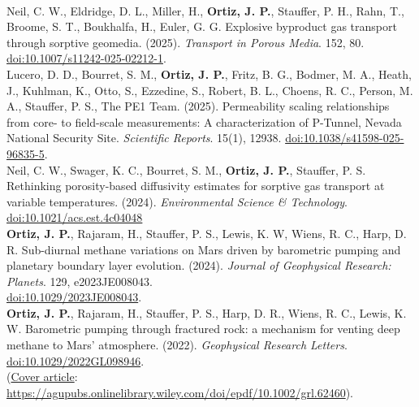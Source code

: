 \documentclass[11pt, letterpaper]{article}
\newcommand{\years}[1]{\marginnote{\scriptsize #1}}
\begin{document}
\JournalofEnvironmentOOOOPreferentialadsorpti\\
%
\years{2025}Neil, C. W., Eldridge, D. L., Miller, H., \textbf{Ortiz, J. P.},
Stauffer, P. H., Rahn, T., Broome, S. T., Boukhalfa, H., Euler, G. G.
Explosive byproduct gas transport through sorptive geomedia. (2025).
\emph{Transport in Porous Media}. 152, 80.
\href{https://doi.org/10.1007/s11242-025-02212-1}{doi:10.1007/s11242-025-02212-1}.
\TransportinPorousMedOOOOExplosivebyproductga\\
%
\years{2025}Lucero, D. D., Bourret, S. M., \textbf{Ortiz, J. P.}, Fritz, B. G.,
Bodmer, M. A., Heath, J., Kuhlman, K., Otto, S., Ezzedine, S., Robert, B. L.,
Choens, R. C., Person, M. A., Stauffer, P. S., The PE1 Team. (2025). 
Permeability scaling relationships from core- to field-scale measurements: A
characterization of P-Tunnel, Nevada National Security Site.
\emph{Scientific Reports}. 15(1), 12938. \href{https://doi.org/10.1038/s41598-025-96835-5}{doi:10.1038/s41598-025-96835-5}.
\ScientificReportsOOOOPermeabilityscalingr\\
%
\years{2024}Neil, C. W., Swager, K. C., Bourret, S. M., \textbf{Ortiz, J.  P.},
Stauffer, P. S.  Rethinking porosity-based diffusivity estimates for sorptive
gas transport at variable temperatures.  (2024).  \emph{Environmental Science
\& Technology}. 
\href{https://doi.org/10.1021/acs.est.4c04048}{doi:10.1021/acs.est.4c04048}
\EnvironmentalScienceOOOORethinkingporosityba\\
%
\years{2024}\textbf{Ortiz, J. P.}, Rajaram, H., Stauffer, P. S., Lewis, K. W,
Wiens, R. C., Harp, D. R.  Sub-diurnal methane variations on Mars driven by
barometric pumping and planetary boundary layer evolution. (2024). \emph{Journal of
Geophysical Research: Planets}. 129, e2023JE008043.\\
\href{https://agupubs.onlinelibrary.wiley.com/doi/epdf/10.1029/2023JE008043}{doi:10.1029/2023JE008043}.
\JournalofGeophysicalOOOOSubDiurnalMethaneVar\\ 
%
\years{2022}\textbf{Ortiz, J. P.}, Rajaram, H., Stauffer, P. S., Harp, D. R.,
Wiens, R. C., Lewis, K. W.  Barometric pumping through fractured rock: a
mechanism for venting deep methane to Mars' atmosphere. (2022). \emph{Geophysical
Research Letters}. 
\href{https://agupubs.onlinelibrary.wiley.com/doi/epdf/10.1029/2022GL098946}{doi:10.1029/2022GL098946}.
\GeophysicalResearchLOOOOBarometricpumpingthr\\
\hypersetup{linkcolor=black,citecolor=blue,filecolor=black,urlcolor=blue} 
(\underline{Cover article}:
\href{https://agupubs.onlinelibrary.wiley.com/doi/epdf/10.1002/grl.62460}{https://agupubs.onlinelibrary.wiley.com/doi/epdf/10.1002/grl.62460}).\\ 
\end{document}
